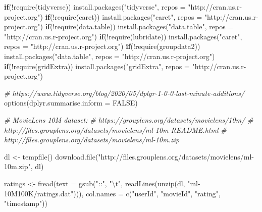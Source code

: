 \documentclass[
]{article}
\newenvironment{Shaded}{}{}
\newcommand{\AttributeTok}[1]{\textcolor[rgb]{0.49,0.56,0.16}{#1}}
\newcommand{\CommentTok}[1]{\textcolor[rgb]{0.38,0.63,0.69}{\textit{#1}}}
\newcommand{\ConstantTok}[1]{\textcolor[rgb]{0.53,0.00,0.00}{#1}}
\newcommand{\ControlFlowTok}[1]{\textcolor[rgb]{0.00,0.44,0.13}{\textbf{#1}}}
\newcommand{\FunctionTok}[1]{\textcolor[rgb]{0.02,0.16,0.49}{#1}}
\newcommand{\NormalTok}[1]{#1}
\newcommand{\OtherTok}[1]{\textcolor[rgb]{0.00,0.44,0.13}{#1}}
\newcommand{\SpecialCharTok}[1]{\textcolor[rgb]{0.25,0.44,0.63}{#1}}
\newcommand{\StringTok}[1]{\textcolor[rgb]{0.25,0.44,0.63}{#1}}
\begin{document}
\begin{Shaded}
\begin{Highlighting}[]
\ControlFlowTok{if}\NormalTok{(}\SpecialCharTok{!}\FunctionTok{require}\NormalTok{(tidyverse)) }\FunctionTok{install.packages}\NormalTok{(}\StringTok{"tidyverse"}\NormalTok{, }\AttributeTok{repos =} \StringTok{"http://cran.us.r{-}project.org"}\NormalTok{)}
\ControlFlowTok{if}\NormalTok{(}\SpecialCharTok{!}\FunctionTok{require}\NormalTok{(caret)) }\FunctionTok{install.packages}\NormalTok{(}\StringTok{"caret"}\NormalTok{, }\AttributeTok{repos =} \StringTok{"http://cran.us.r{-}project.org"}\NormalTok{)}
\ControlFlowTok{if}\NormalTok{(}\SpecialCharTok{!}\FunctionTok{require}\NormalTok{(data.table)) }\FunctionTok{install.packages}\NormalTok{(}\StringTok{"data.table"}\NormalTok{, }\AttributeTok{repos =} \StringTok{"http://cran.us.r{-}project.org"}\NormalTok{)}
\ControlFlowTok{if}\NormalTok{(}\SpecialCharTok{!}\FunctionTok{require}\NormalTok{(lubridate)) }\FunctionTok{install.packages}\NormalTok{(}\StringTok{"caret"}\NormalTok{, }\AttributeTok{repos =} \StringTok{"http://cran.us.r{-}project.org"}\NormalTok{)}
\ControlFlowTok{if}\NormalTok{(}\SpecialCharTok{!}\FunctionTok{require}\NormalTok{(groupdata2)) }\FunctionTok{install.packages}\NormalTok{(}\StringTok{"data.table"}\NormalTok{, }\AttributeTok{repos =} \StringTok{"http://cran.us.r{-}project.org"}\NormalTok{)}
\ControlFlowTok{if}\NormalTok{(}\SpecialCharTok{!}\FunctionTok{require}\NormalTok{(gridExtra)) }\FunctionTok{install.packages}\NormalTok{(}\StringTok{"gridExtra"}\NormalTok{, }\AttributeTok{repos =} \StringTok{"http://cran.us.r{-}project.org"}\NormalTok{)}

\CommentTok{\# https://www.tidyverse.org/blog/2020/05/dplyr{-}1{-}0{-}0{-}last{-}minute{-}additions/}
\FunctionTok{options}\NormalTok{(}\AttributeTok{dplyr.summarise.inform =} \ConstantTok{FALSE}\NormalTok{)}

\CommentTok{\# MovieLens 10M dataset:}
\CommentTok{\# https://grouplens.org/datasets/movielens/10m/}
\CommentTok{\# http://files.grouplens.org/datasets/movielens/ml{-}10m{-}README.html}
\CommentTok{\# http://files.grouplens.org/datasets/movielens/ml{-}10m.zip}

\NormalTok{dl }\OtherTok{\textless{}{-}} \FunctionTok{tempfile}\NormalTok{()}
\FunctionTok{download.file}\NormalTok{(}\StringTok{"http://files.grouplens.org/datasets/movielens/ml{-}10m.zip"}\NormalTok{, dl)}

\NormalTok{ratings }\OtherTok{\textless{}{-}} \FunctionTok{fread}\NormalTok{(}\AttributeTok{text =} \FunctionTok{gsub}\NormalTok{(}\StringTok{"::"}\NormalTok{, }\StringTok{"}\SpecialCharTok{\textbackslash{}t}\StringTok{"}\NormalTok{, }\FunctionTok{readLines}\NormalTok{(}\FunctionTok{unzip}\NormalTok{(dl, }\StringTok{"ml{-}10M100K/ratings.dat"}\NormalTok{))),}
                 \AttributeTok{col.names =} \FunctionTok{c}\NormalTok{(}\StringTok{"userId"}\NormalTok{, }\StringTok{"movieId"}\NormalTok{, }\StringTok{"rating"}\NormalTok{, }\StringTok{"timestamp"}\NormalTok{))}


\end{Highlighting}
\end{Shaded}
\end{document}
